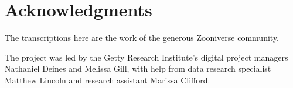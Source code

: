 \makeatletter
\renewcommand*\cleardoublepage{\clearpage\if@twoside
  \ifodd\c@page \hbox{}\newpage\if@twocolumn\hbox{}%
  \newpage\fi\fi\fi}
\makeatother

\chapter*{Acknowledgments}

The transcriptions here are the work of the generous Zooniverse community.

The project was led by the Getty Research Institute's digital project managers Nathaniel Deines and Melissa Gill, with help from data research specialist Matthew Lincoln and research assistant Marissa Clifford.
